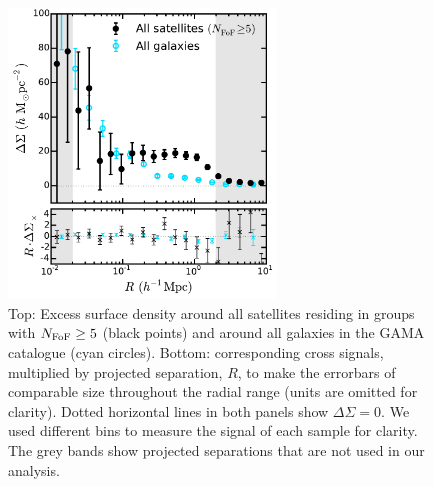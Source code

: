\begin{figure}
\begin{minipage}[b]{2.8in}
 \centerline{\includegraphics[width=2.8in]{chapter5/signal_all_10Mpc.pdf}}
\end{minipage}
\begin{minipage}[b]{2in}
\caption{Top: Excess surface density around all satellites residing in groups with $N_{\rm 
FoF}\geq5$ (black points) and around all galaxies in the GAMA catalogue (cyan circles). 
Bottom: corresponding cross signals, multiplied by projected separation, $R$, to 
make the errorbars of comparable size throughout the radial range (units are omitted for clarity). 
Dotted horizontal lines in both panels show $\Delta\Sigma=0$. We used different bins to measure the 
signal of each sample for clarity. The grey bands show projected separations that are not used in 
our analysis.}
\label{f:esd_all}
\end{minipage}
\end{figure}

